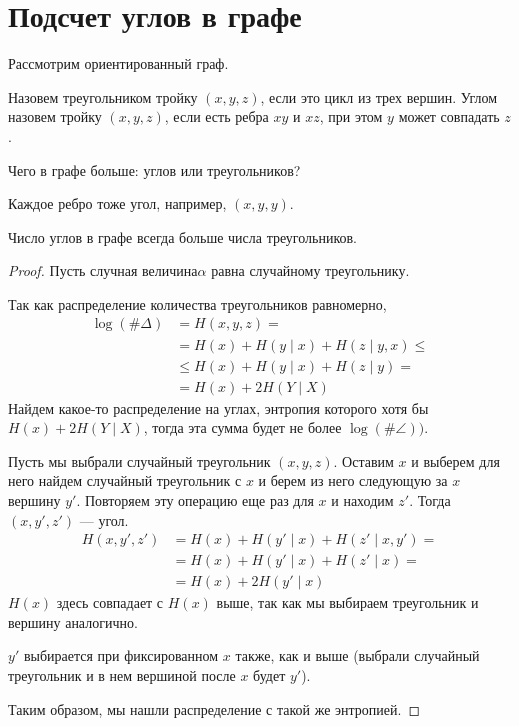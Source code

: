 \section{Подсчет углов в графе}
Рассмотрим ориентированный граф.

Назовем треугольником тройку $ (x, y, z)$, если это цикл из трех вершин. Углом назовем тройку  $ (x, y, z)$, если есть ребра  $ xy$ и $xz$, при этом  $ y $ может совпадать  $ z$.

Чего в графе больше: углов или треугольников?
\begin{note}
	Каждое ребро тоже угол, например, $ (x, y, y)$.
\end{note}
\begin{thm}
    Число углов в графе всегда больше числа треугольников.
\end{thm}
\begin{proof}
	Пусть случная величина$ \alpha $ равна случайному треугольнику.

	Так как распределение количества треугольников равномерно,
	\begin{align*}
		\log (\# \Delta)& = H(x, y, z)  = \tag{Chain rule} \\
					  &= H(x) + H(y \mid x) + H(z \mid  y, x) \le  \\
					  & \le  H(x) + H(y \mid x) + H(z \mid y) = \tag{циклический сдвиг в треугольнике} \\
		 & = H(x) + 2 H(Y \mid X)
	\end{align*}
Найдем какое-то распределение на углах, энтропия которого хотя бы $ H(x) + 2H(Y \mid X)$, тогда эта сумма будет не более  $  \log (\# \angle)) $.

	Пусть мы выбрали случайный треугольник $ (x, y, z)$. Оставим $ x$ и выберем для него найдем случайный треугольник с $ x$ и берем из него следующую за $ x$ вершину $ y'$. Повторяем эту операцию еще раз для $ x$ и находим  $ z'$. Тогда $ (x,  y', z')$ --- угол.
	\begin{align*}
		H(x, y', z') & = H(x) + H(y' \mid x) + H(z' \mid x, y') = \tag{Так как $ y'$ и  $ z'$ независимы при выбранном  $ x$}  \\
					 & =H(x) + H(y'\mid x) + H(z' \mid x) = \tag{Выбор аналогичный} \\
					 & = H(x) + 2 H(y' \mid x)
	\end{align*}
	$ H(x)$ здесь совпадает с  $ H(x) $ выше, так как мы выбираем треугольник и вершину аналогично.

	$ y'$ выбирается при фиксированном  $ x$ также, как и выше (выбрали случайный треугольник и в нем вершиной после $ x$ будет  $ y'$).

	Таким образом, мы нашли распределение с такой же энтропией.
\end{proof}


